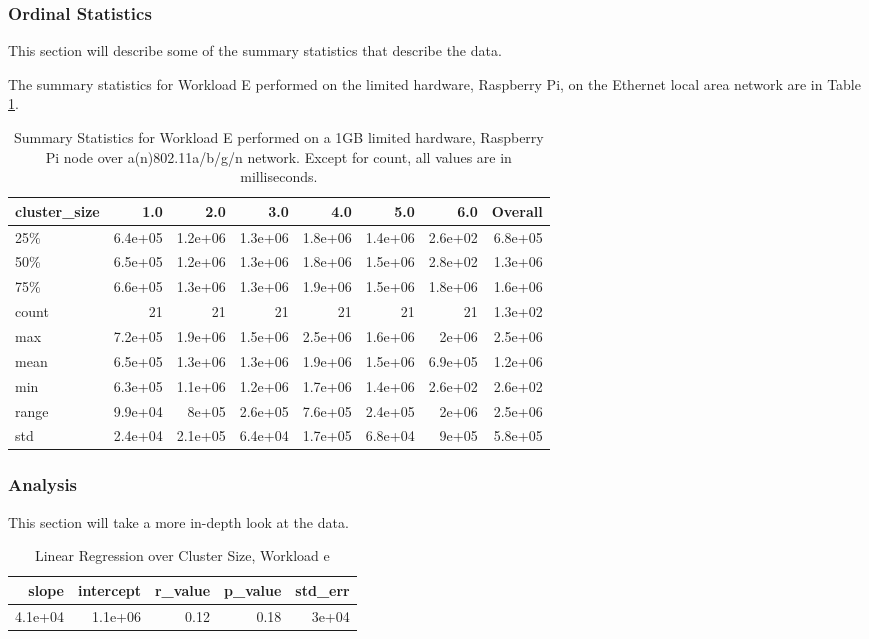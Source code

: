 \subsubsection{Ordinal Statistics}
This section will describe some of the summary statistics that describe the data.  

The summary statistics for Workload E performed on the limited hardware, Raspberry Pi, on the Ethernet local area network are in Table \ref{table:summary_table_e_1GB_rp_wlan}.
\begin{table}
\begin{tabular}{lrrrrrrr}
\toprule
cluster\_size &     1.0 &     2.0 &     3.0 &     4.0 &     5.0 &     6.0 &  Overall \\
\midrule
25\%   & 6.4e+05 & 1.2e+06 & 1.3e+06 & 1.8e+06 & 1.4e+06 & 2.6e+02 &  6.8e+05 \\
50\%   & 6.5e+05 & 1.2e+06 & 1.3e+06 & 1.8e+06 & 1.5e+06 & 2.8e+02 &  1.3e+06 \\
75\%   & 6.6e+05 & 1.3e+06 & 1.3e+06 & 1.9e+06 & 1.5e+06 & 1.8e+06 &  1.6e+06 \\
count &      21 &      21 &      21 &      21 &      21 &      21 &  1.3e+02 \\
max   & 7.2e+05 & 1.9e+06 & 1.5e+06 & 2.5e+06 & 1.6e+06 &   2e+06 &  2.5e+06 \\
mean  & 6.5e+05 & 1.3e+06 & 1.3e+06 & 1.9e+06 & 1.5e+06 & 6.9e+05 &  1.2e+06 \\
min   & 6.3e+05 & 1.1e+06 & 1.2e+06 & 1.7e+06 & 1.4e+06 & 2.6e+02 &  2.6e+02 \\
range & 9.9e+04 &   8e+05 & 2.6e+05 & 7.6e+05 & 2.4e+05 &   2e+06 &  2.5e+06 \\
std   & 2.4e+04 & 2.1e+05 & 6.4e+04 & 1.7e+05 & 6.8e+04 &   9e+05 &  5.8e+05 \\
\bottomrule
\end{tabular}
\caption{Summary Statistics for Workload E performed on a 1GB limited hardware, Raspberry Pi node over a(n)802.11a/b/g/n network.  Except for count, all values are in milliseconds.}
\label{table:summary_table_e_1GB_rp_wlan}
\end{table}



\subsubsection{Analysis}
This section will take a more in-depth look at the data.


\begin{table}[H]
\centering
\begin{tabular}{rrrrr}
\toprule
  slope &  intercept &  r\_value &  p\_value &  std\_err \\
\midrule
4.1e+04 &    1.1e+06 &     0.12 &     0.18 &    3e+04 \\
\bottomrule
\end{tabular}
\caption{Linear Regression over Cluster Size, Workload e}
\label{table:wlan_only_e}
\end{table}



